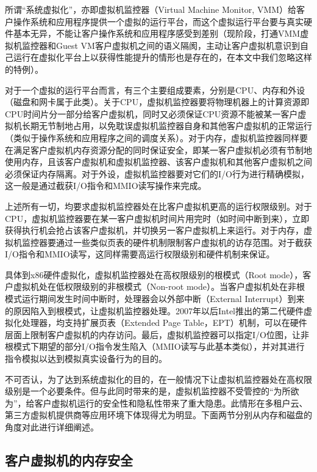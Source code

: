 所谓``系统虚拟化''，亦即虚拟机监控器（Virtual Machine Monitor, VMM）给客户操作系统和应用程序提供一个虚拟的运行平台，而这个虚拟运行平台要与真实硬件基本无异，不能让客户操作系统和应用程序感受到差别（现阶段，打通VMM虚拟机监控器和Guest VM客户虚拟机之间的语义隔阂，主动让客户虚拟机意识到自己运行在虚拟化平台上以获得性能提升的情形也是存在的，在本文中我们忽略这样的特例）。

对于一个虚拟的运行平台而言，有三个主要组成要素，分别是CPU、内存和外设（磁盘和网卡属于此类）。关于CPU，虚拟机监控器要将物理机器上的计算资源即CPU时间片分一部分给客户虚拟机，同时又必须保证CPU资源不能被某一客户虚拟机长期无节制地占用，以免耽误虚拟机监控器自身和其他客户虚拟机的正常运行（类似于操作系统和应用程序之间的调度关系）。对于内存，虚拟机监控器同样要在满足客户虚拟机内存资源分配的同时保证安全，即某一客户虚拟机必须有节制地使用内存，且该客户虚拟机和虚拟机监控器、该客户虚拟机和其他客户虚拟机之间必须保证内存隔离。对于外设，虚拟机监控器要对它们的I/O行为进行精确模拟，这一般是通过截获I/O指令和MMIO读写操作来完成。

上述所有一切，均要求虚拟机监控器处在比客户虚拟机更高的运行权限级别。对于CPU，虚拟机监控器要在某一客户虚拟机时间片用完时（如时间中断到来），立即获得执行机会抢占该客户虚拟机，并切换另一客户虚拟机上来运行。对于内存，虚拟机监控器要通过一些类似页表的硬件机制限制客户虚拟机的访存范围。对于截获I/O指令和MMIO读写，这同样需要高运行权限级别和硬件机制来保证。

具体到x86硬件虚拟化，虚拟机监控器处在高权限级别的根模式（Root mode），客户虚拟机处在低权限级别的非根模式（Non-root mode）。当客户虚拟机处在非根模式运行期间发生时间中断时，处理器会以外部中断（External Interrupt）到来的原因陷入到根模式，让虚拟机监控器处理。2007年以后Intel推出的第二代硬件虚拟化处理器，均支持扩展页表（Extended Page Table，EPT）机制，可以在硬件层面上限制客户虚拟机的内存访问。最后，虚拟机监控器可以指定I/O位图，让非根模式下期望的部分I/O指令发生陷入（MMIO读写与此基本类似），并对其进行指令模拟以达到模拟真实设备行为的目的。

不可否认，为了达到系统虚拟化的目的，在一般情况下让虚拟机监控器处在高权限级别是一个必要条件。但与此同时带来的是，虚拟机监控器不受管控的``为所欲为''，给客户虚拟机运行的安全性和隐私性带来了重大隐患。此情形在多租户云、第三方虚拟机提供商等应用环境下体现得尤为明显。下面两节分别从内存和磁盘的角度对此进行详细阐述。

\subsection{客户虚拟机的内存安全}

